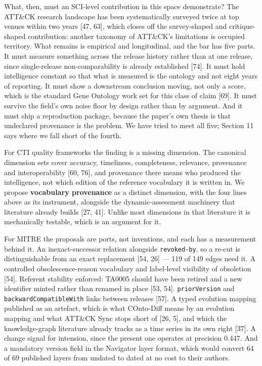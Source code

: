\documentclass[11pt,a4paper]{article}
\begin{document}
What, then, must an SCI-level contribution in this space demonstrate? The ATT\&CK research landscape has been systematically surveyed twice at top venues within two years [47, 63], which closes off the survey-shaped and critique-shaped contribution: another taxonomy of ATT\&CK's limitations is occupied territory. What remains is empirical and longitudinal, and the bar has five parts. It must measure something across the release history rather than at one release, since single-release non-comparability is already established [74]. It must hold intelligence constant so that what is measured is the ontology and not eight years of reporting. It must show a downstream conclusion moving, not only a score, which is the standard Gene Ontology work set for this class of claim [69]. It must survive the field's own noise floor by design rather than by argument. And it must ship a reproduction package, because the paper's own thesis is that undeclared provenance is the problem. We have tried to meet all five; Section 11 says where we fall short of the fourth.

For CTI quality frameworks the finding is a missing dimension. The canonical dimension sets cover accuracy, timeliness, completeness, relevance, provenance and interoperability [60, 76], and provenance there means who produced the intelligence, not which edition of the reference vocabulary it is written in. We propose \textbf{vocabulary provenance} as a distinct dimension, with the four lines above as its instrument, alongside the dynamic-assessment machinery that literature already builds [27, 41]. Unlike most dimensions in that literature it is mechanically testable, which is an argument for it.

For MITRE the proposals are ports, not inventions, and each has a measurement behind it. An inexact-successor relation alongside \texttt{revoked-by}, so a re-cut is distinguishable from an exact replacement [54, 26] — 119 of 149 edges need it. A controlled obsolescence-reason vocabulary and label-level visibility of obsoletion [54]. Referent stability enforced: TA0005 should have been retired and a new identifier minted rather than renamed in place [53, 54]. \texttt{priorVersion} and \texttt{backwardCompatibleWith} links between releases [57]. A typed evolution mapping published as an artefact, which is what COnto-Diff means by an evolution mapping and what ATT\&CK Sync stops short of [26, 5], and which the knowledge-graph literature already tracks as a time series in its own right [37]. A change signal for intension, since the present one operates at precision 0.447. And a mandatory version field in the Navigator layer format, which would convert 64 of 69 published layers from undated to dated at no cost to their authors.
\end{document}
